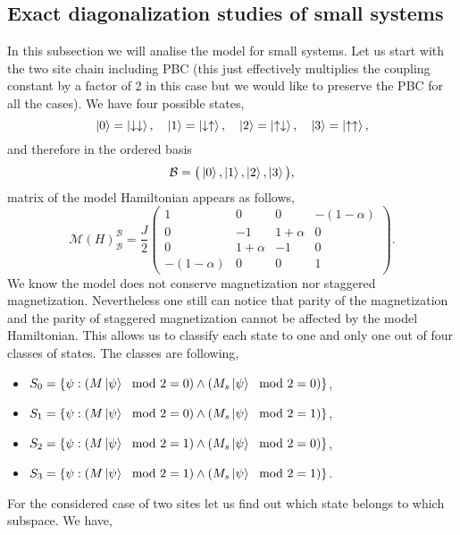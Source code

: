 \documentclass[12pt, a4paper]{article}
\begin{document}
\subsection{Exact diagonalization studies of small systems}
In this subsection we will analise the model for small systems. Let us start with the two site chain including PBC (this just effectively multiplies the coupling constant by a factor of 2 in this case but we would like to preserve the PBC for all the cases). We have four possible states,
\begin{equation}
\ket{0} = \ket{\downarrow\downarrow}, \quad \ket{1} = \ket{\downarrow\uparrow}, \quad \ket{2} = \ket{\uparrow\downarrow}, \quad \ket{3} = \ket{\uparrow\uparrow},
\end{equation}
and therefore in the ordered basis
\begin{equation}
\mathcal{B} = \big(\ket{0}, \ket{1}, \ket{2}, \ket{3}\big),
\end{equation}
matrix of the model Hamiltonian appears as follows,
\begin{equation}
\mathcal{M}(H)_{\mathcal{B}}^{\mathcal{B}} = \frac{J}{2} \begin{pmatrix}
1 & 0 & 0 & -(1-\alpha) \\
0 & -1 & 1+\alpha & 0 \\
0 & 1+\alpha & -1 & 0 \\
-(1-\alpha) & 0 & 0 & 1
\end{pmatrix}.
\end{equation}
We know the model does not conserve magnetization nor staggered magnetization. Nevertheless one still can notice that parity of the magnetization and the parity of staggered magnetization cannot be affected by the model Hamiltonian. This allows us to classify each state to one and only one out of four classes of states. The classes are following,
\begin{itemize}
	\item $S_0 = \{\psi : (M\ket{\psi}\mod 2 = 0) \land  (M_s \ket{\psi}\mod 2 = 0)\}$,
	\item $S_1 = \{\psi : (M\ket{\psi}\mod 2 = 0) \land  (M_s \ket{\psi}\mod 2 = 1)\}$,
	\item $S_2 = \{\psi : (M\ket{\psi}\mod 2 = 1) \land  (M_s \ket{\psi}\mod 2 = 0)\}$,
	\item $S_3 = \{\psi : (M\ket{\psi}\mod 2 = 1) \land  (M_s \ket{\psi}\mod 2 = 1)\}$.
\end{itemize}
For the considered case of two sites let us find out which state belongs to which subspace. We have,
\end{document}
